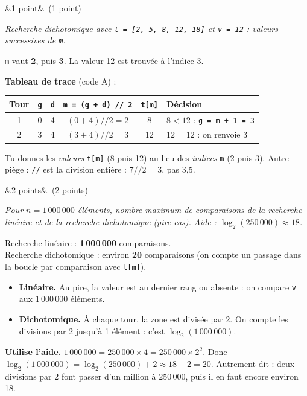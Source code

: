 \documentclass[11pt, a4paper]{exam}
\newcommand{\code}[1]{\texttt{#1}}
\newcommand{\Q}[3]{\par\needspace{5\baselineskip}\bigskip\noindent{\large\bfseries Question #1}\ifx&#2&\else\ \textnormal{(#2)}\fi\par\nopagebreak\smallskip\noindent\textit{#3}\par\nopagebreak\smallskip}
\begin{document}
\Q{5 (b)}{1 point}{Recherche dichotomique avec \code{t = [2, 5, 8, 12, 18]} et \code{v = 12} : valeurs successives de \code{m}.}
\begin{reponse}
\code{m} vaut \textbf{2}, puis \textbf{3}. La valeur 12 est trouvée à l'indice 3.
\end{reponse}
\textbf{Tableau de trace} (code A) :
\begin{center}
\renewcommand{\arraystretch}{1.2}
\begin{tabular}{|c|c|c|c|c|l|}
\hline
\textbf{Tour} & \code{g} & \code{d} & \code{m = (g + d) // 2} & \code{t[m]} & \textbf{Décision} \\ \hline
1 & 0 & 4 & $(0 + 4) // 2 = 2$ & 8 & $8 < 12$ : \code{g = m + 1 = 3} \\
2 & 3 & 4 & $(3 + 4) // 2 = 3$ & 12 & $12 = 12$ : on renvoie 3 \\ \hline
\end{tabular}
\end{center}
\begin{erreur}
Tu donnes les \emph{valeurs} \code{t[m]} (8 puis 12) au lieu des \emph{indices} \code{m} (2 puis 3). Autre piège : \code{//} est la division entière : $7 // 2 = 3$, pas 3,5.
\end{erreur}

\Q{5 (c)}{2 points}{Pour $n = 1\,000\,000$ éléments, nombre maximum de comparaisons de la recherche linéaire et de la recherche dichotomique (pire cas). Aide : $\log_2(250\,000) \approx 18$.}
\begin{reponse}
Recherche linéaire : \textbf{1\,000\,000} comparaisons. \\
Recherche dichotomique : environ \textbf{20} comparaisons (on compte un passage dans la boucle par comparaison avec \code{t[m]}).
\end{reponse}
\begin{itemize}
\item \textbf{Linéaire.} Au pire, la valeur est au dernier rang ou absente : on compare \code{v} aux $1\,000\,000$ éléments.
\item \textbf{Dichotomique.} À chaque tour, la zone est divisée par 2. On compte les divisions par 2 jusqu'à 1 élément : c'est $\log_2(1\,000\,000)$.
\end{itemize}
\textbf{Utilise l'aide.} $1\,000\,000 = 250\,000 \times 4 = 250\,000 \times 2^2$. Donc $\log_2(1\,000\,000) = \log_2(250\,000) + 2 \approx 18 + 2 = 20$. Autrement dit : deux divisions par 2 font passer d'un million à $250\,000$, puis il en faut encore environ 18.
\end{document}
